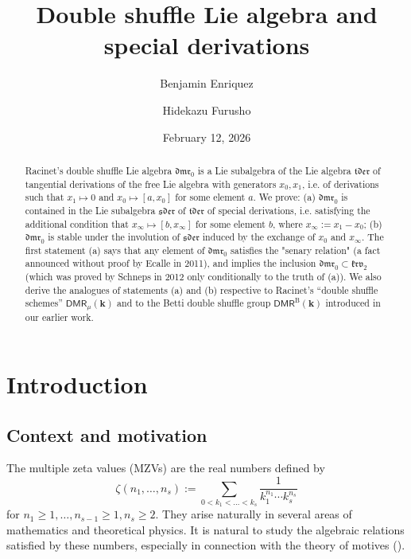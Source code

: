 \documentclass[10pt]{amsart}
\author{Benjamin Enriquez}
\author{Hidekazu Furusho}
\date{February 12, 2026} %
\numberwithin{equation}{subsection}
\begin{document}

\title[Double shuffle Lie algebra and special derivations]{Double shuffle Lie algebra and special derivations}

\begin{abstract}
Racinet's double shuffle Lie algebra $\mathfrak{dmr}_0$ is a Lie subalgebra of the Lie algebra $\mathfrak{tder}$ of 
tangential derivations of the free Lie algebra with generators $x_0,x_1$, i.e. of derivations such that $x_1\mapsto 0$ and 
$x_0\mapsto [a,x_0]$ for some element $a$. We prove: (a) $\mathfrak{dmr}_0$ is contained in the Lie subalgebra 
$\mathfrak{sder}$ of $\mathfrak{tder}$ of special derivations, i.e. satisfying the additional condition that 
$x_\infty\mapsto [b,x_\infty]$ for some element $b$, where $x_\infty:=x_1-x_0$; (b)  $\mathfrak{dmr}_0$ is stable 
under the involution of $\mathfrak{sder}$ induced by the exchange of $x_0$ and $x_\infty$. 
The first statement %
(a) says that any element of $\mathfrak{dmr}_0$ 
satisfies the "senary relation" (a fact announced without proof 
by Ecalle in 2011), and implies the inclusion $\mathfrak{dmr}_0\subset \mathfrak{krv}_2$ (which was proved by Schneps in 
2012 only conditionally to the truth of (a)). We also derive the analogues of statements (a) and 
(b) respective to Racinet's ``double shuffle schemes'' $\mathsf{DMR}_\mu(\mathbf k)$
and to the Betti double shuffle group $\mathsf{DMR}^{\mathrm{B}}(\mathbf k)$ introduced in our
earlier work. 
\end{abstract}
%
\maketitle
\setcounter{tocdepth}{2}
{\footnotesize \tableofcontents}

\section*{Introduction}

\subsection{Context and motivation}\label{sect:context:motivation}

The multiple zeta values (MZVs) are the real numbers defined by 
$$
\zeta(n_1,\ldots,n_s):=\sum_{0<k_1<\ldots<k_s}\frac{1}{
k_1^{n_1}\cdots k_s^{n_s}} 
$$
for $n_1\geq1,\ldots,n_{s-1}\geq1,n_s\geq2$. They arise naturally in several areas of  mathematics
and theoretical physics. It is natural to study the algebraic relations satisfied by these numbers, 
especially in connection with the theory of motives (\cite{De,DeG}). 
\end{document}
